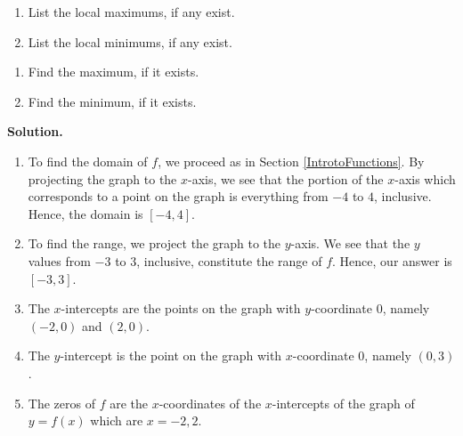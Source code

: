 \begin{ex}
\begin{multicols}{2}
\begin{enumerate}
\setcounter{enumi}{\value{HW}}

\item  List the local maximums, if any exist.

\item  List the local minimums, if any exist.

\setcounter{HW}{\value{enumi}}
\end{enumerate}
\end{multicols}

\begin{multicols}{2}
\begin{enumerate}
\setcounter{enumi}{\value{HW}}

\item  Find the maximum, if it exists.

\item  Find the minimum, if it exists.

\setcounter{HW}{\value{enumi}}
\end{enumerate}
\end{multicols}

\medskip

{\bf Solution.} 

\begin{enumerate}

\item  To find the domain of $f$, we proceed as in Section \ref{IntrotoFunctions}.  By projecting the graph to the $x$-axis, we see that the portion of the $x$-axis which corresponds to a point on the graph is everything from $-4$ to $4$, inclusive.  Hence, the domain is $[-4,4]$.

\item  To find the range, we project the graph to the $y$-axis.  We see that the $y$ values from $-3$ to $3$, inclusive, constitute the range of $f$.  Hence, our answer is $[-3,3]$.

\item  The $x$-intercepts are the points on the graph with $y$-coordinate $0$, namely $(-2,0)$ and $(2,0)$.

\item  The $y$-intercept is the point on the graph with $x$-coordinate $0$, namely $(0,3)$.

\item  The zeros of $f$ are the $x$-coordinates of the $x$-intercepts of the graph of $y=f(x)$ which are $x=-2, 2$.


\end{enumerate}
\end{ex}
